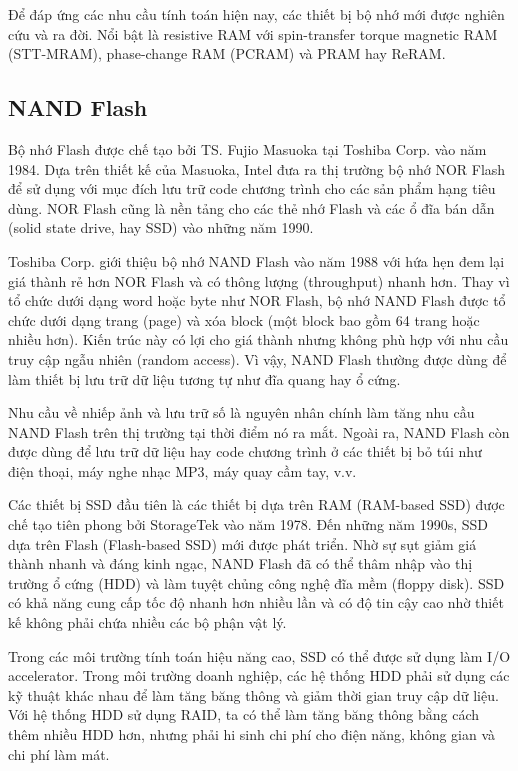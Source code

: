 Để đáp ứng các nhu cầu tính toán hiện nay, các thiết bị bộ nhớ mới được nghiên
cứu và ra đời. Nổi bật là resistive RAM với spin-transfer torque magnetic RAM
(STT-MRAM), phase-change RAM (PCRAM) và PRAM hay ReRAM.

\subsection{NAND Flash}
Bộ nhớ Flash được chế tạo bởi TS. Fujio Masuoka tại Toshiba Corp. vào năm 1984.
Dựa trên thiết kế của Masuoka, Intel đưa ra thị trường bộ nhớ NOR Flash để sử
dụng với mục đích lưu trữ code chương trình cho các sản phẩm hạng tiêu dùng.
NOR Flash cũng là nền tảng cho các thẻ nhớ Flash và các ổ đĩa bán dẫn (solid
state drive, hay SSD) vào những năm 1990.

Toshiba Corp. giới thiệu bộ nhớ NAND Flash vào năm 1988 với hứa hẹn đem lại giá
thành rẻ hơn NOR Flash và có thông lượng (throughput) nhanh hơn. Thay vì tổ
chức dưới dạng word hoặc byte như NOR Flash, bộ nhớ NAND Flash được tổ chức
dưới dạng trang (page) và xóa block (một block bao gồm 64 trang hoặc nhiều
hơn). Kiến trúc này có lợi cho giá thành nhưng không phù hợp với nhu cầu truy
cập ngẫu nhiên (random access). Vì vậy, NAND Flash thường được dùng để làm
thiết bị lưu trữ dữ liệu tương tự như đĩa quang hay ổ cứng.


Nhu cầu về nhiếp ảnh và lưu trữ số là nguyên nhân chính làm tăng nhu cầu NAND
Flash trên thị trường tại thời điểm nó ra mắt. Ngoài ra, NAND Flash còn được
dùng để lưu trữ dữ liệu hay code chương trình ở các thiết bị bỏ túi như điện
thoại, máy nghe nhạc MP3, máy quay cầm tay, v.v.

Các thiết bị SSD đầu tiên là các thiết bị dựa trên RAM (RAM-based SSD) được chế
tạo tiên phong bởi StorageTek vào năm 1978. Đến những năm 1990s, SSD dựa trên
Flash (Flash-based SSD) mới được phát triển. Nhờ sự sụt giảm giá thành nhanh và
đáng kinh ngạc, NAND Flash đã có thể thâm nhập vào thị trường ổ cứng (HDD) và
làm tuyệt chủng công nghệ đĩa mềm (floppy disk). SSD có khả năng cung cấp tốc
độ nhanh hơn nhiều lần và có độ tin cậy cao nhờ thiết kế không phải chứa nhiều
các bộ phận vật lý.

Trong các môi trường tính toán hiệu năng cao, SSD có thể được sử dụng làm I/O
accelerator. Trong môi trường doanh nghiệp, các hệ thống HDD phải sử dụng các
kỹ thuật khác nhau để làm tăng băng thông và giảm thời gian truy cập dữ liệu.
Với hệ thống HDD sử dụng RAID, ta có thể làm tăng băng thông bằng cách thêm
nhiều HDD hơn, nhưng phải hi sinh chi phí cho điện năng, không gian và chi phí
làm mát.


